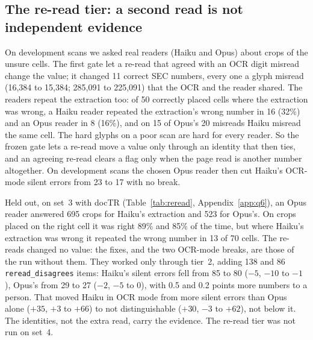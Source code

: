 \documentclass[10pt,twocolumn]{article}
\newcommand{\code}[1]{\texttt{\small #1}}
\begin{document}
\subsection{The re-read tier: a second read is not independent evidence}\label{sec:reread}
On development scans we asked real readers (Haiku and Opus) about crops of the unsure cells. The first gate let a re-read that agreed with an OCR digit misread change the value; it changed 11 correct SEC numbers, every one a glyph misread (16,384 to 15,384; 285,091 to 225,091) that the OCR and the reader shared. The readers repeat the extraction too: of 50 correctly placed cells where the extraction was wrong, a Haiku reader repeated the extraction's wrong number in 16 (32\%) and an Opus reader in 8 (16\%), and on 15 of Opus's 20 misreads Haiku misread the same cell. The hard glyphs on a poor scan are hard for every reader. So the frozen gate lets a re-read move a value only through an identity that then ties, and an agreeing re-read clears a flag only when the page read is another number altogether. On development scans the chosen Opus reader then cut Haiku's OCR-mode silent errors from 23 to 17 with no break.

Held out, on set~3 with docTR (Table~\ref{tab:reread}, Appendix~\ref{app:q6}), an Opus reader answered 695 crops for Haiku's extraction and 523 for Opus's. On crops placed on the right cell it was right 89\% and 85\% of the time, but where Haiku's extraction was wrong it repeated the wrong number in 13 of 70 cells. The re-reads changed no value: the fixes, and the two OCR-mode breaks, are those of the run without them. They worked only through tier~2, adding 138 and 86 \code{reread\_disagrees} items: Haiku's silent errors fell from 85 to 80 ($-5$, $-10$ to $-1$), Opus's from 29 to 27 ($-2$, $-5$ to $0$), with 0.5 and 0.2 points more numbers to a person. That moved Haiku in OCR mode from more silent errors than Opus alone ($+35$, $+3$ to $+66$) to not distinguishable ($+30$, $-3$ to $+62$), not below it. The identities, not the extra read, carry the evidence. The re-read tier was not run on set~4.
\end{document}
